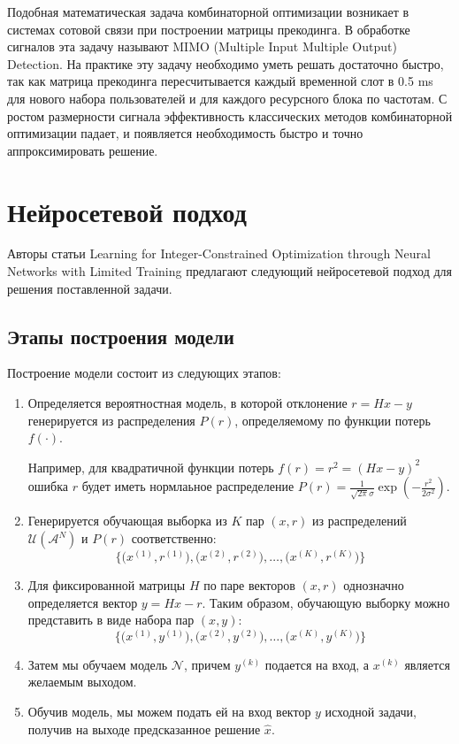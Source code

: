 \documentclass[12pt]{article}
\begin{document}
Подобная математическая задача комбинаторной оптимизации возникает в системах сотовой связи при построении матрицы прекодинга. В обработке сигналов эта задачу называют MIMO (Multiple Input Multiple Output) Detection. На практике эту задачу необходимо уметь решать достаточно быстро, так как матрица прекодинга пересчитывается каждый временной слот в 0.5 ms для нового набора пользователей и для каждого ресурсного блока по частотам. С ростом размерности сигнала эффективность классических методов комбинаторной оптимизации падает, и появляется необходимость быстро и точно аппроксимировать решение. 


\section{Нейросетевой подход}
Авторы статьи Learning for Integer-Constrained Optimization through Neural Networks with Limited Training \cite{zhou2020learning} предлагают следующий нейросетевой подход для решения поставленной задачи.

\subsection{Этапы построения модели}

Построение модели состоит из следующих этапов:

\begin{enumerate}
    \item Определяется вероятностная модель, в которой отклонение $r = Hx - y$ генерируется из распределения $P(r)$, определяемому по функции потерь $f(\cdot)$.

        Например, для квадратичной функции потерь $f(r) = r^2 = (Hx - y)^2$ ошибка $r$ будет иметь нормлаьное распределение $P(r) = \frac{1}{\sqrt{2 \pi}\sigma} \exp \left( -\frac{r^2}{2 \sigma^2} \right)$.

    \item Генерируется обучающая выборка из $K$ пар $(x, r)$ из распределений $\mathcal{U}(\mathcal{A}^N)$ и $P(r)$ соответственно:
        $$
        \bigg\{ \Big( x^{(1)}, r^{(1)} \Big), \Big( x^{(2)}, r^{(2)} \Big), \ldots, \Big( x^{(K)}, r^{(K)} \Big) \bigg\}
        $$
    
    \item Для фиксированной матрицы $H$ по паре векторов $(x, r)$ однозначно определяется вектор $y = Hx - r$. Таким образом, обучающую выборку можно представить в виде набора пар $(x, y)$:
        $$
        \bigg\{ \Big( x^{(1)}, y^{(1)} \Big), \Big( x^{(2)}, y^{(2)} \Big), \ldots, \Big( x^{(K)}, y^{(K)} \Big) \bigg\}
        $$
    
    \item Затем мы обучаем модель $\mathcal{N}$, причем $y^{(k)}$ подается на вход, а $x^{(k)}$ является желаемым выходом.
    
    \item Обучив модель, мы можем подать ей на вход вектор $y$ исходной задачи, получив на выходе предсказанное решение $\hat x$.
\end{enumerate}
\end{document}

